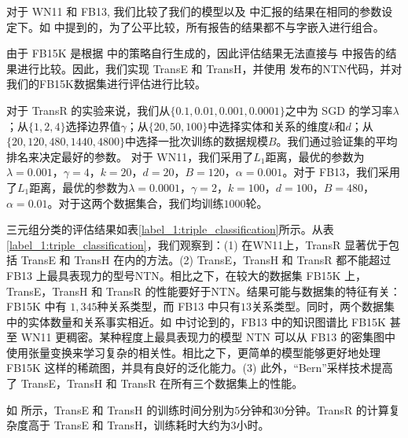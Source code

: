     对于 WN11 和 FB13, 我们比较了我们的模型以及  中汇报的结果在相同的参数设定下。如  中提到的，为了公平比较，所有报告的结果都不与字嵌入进行组合。

    由于 FB15K 是根据  中的策略自行生成的，因此评估结果无法直接与  中报告的结果进行比较。因此，我们实现 TransE 和 TransH，并使用  发布的NTN代码，并对我们的FB15K数据集进行评估进行比较。

    对于 TransR 的实验来说，我们从$\{0.1, 0.01, 0.001, 0.0001\}$之中为 SGD 的学习率$\lambda$；从$\{1, 2, 4\}$选择边界值$\gamma$；从$\{20,50,100\}$中选择实体和关系的维度$k$和$d$；从$\{20, 120, 480, 1440, 4800\}$中选择一批次训练的数据规模$B$。我们通过验证集的平均排名来决定最好的参数。
    对于 WN11，我们采用了$L_1$距离，最优的参数为$\lambda = 0.001$，$\gamma= 4$，$k = 20$，$d = 20$，$B = 120$，$\alpha=0.001$。对于 FB13，我们采用了$L_1$距离，最优的参数为$\lambda = 0.0001$，$\gamma = 2$，$k = 100$，$d = 100$，$B = 480$，$\alpha=0.01$。对于这两个数据集合，我们均训练$1000$轮。

    三元组分类的评估结果如表\ref{label_1:triple_classification}所示。从表\ref{label_1:triple_classification}，我们观察到：(1) 在WN11上，TransR 显著优于包括 TransE 和 TransH 在内的方法。(2) TransE，TransH 和 TransR 都不能超过 FB13 上最具表现力的型号NTN。相比之下，在较大的数据集 FB15K 上，TransE，TransH 和 TransR 的性能要好于NTN。结果可能与数据集的特征有关：FB15K 中有 $1,345$种关系类型，而 FB13 中只有$13$关系类型。同时，两个数据集中的实体数量和关系事实相近。如  中讨论到的，FB13 中的知识图谱比 FB15K 甚至 WN11 更稠密。某种程度上最具表现力的模型 NTN 可以从 FB13 的密集图中使用张量变换来学习复杂的相关性。相比之下，更简单的模型能够更好地处理 FB15K 这样的稀疏图，并具有良好的泛化能力。(3) 此外，``Bern''采样技术提高了 TransE，TransH 和 TransR 在所有三个数据集上的性能。

    如  所示，TransE 和 TransH 的训练时间分别为$5$分钟和$30$分钟。TransR 的计算复杂度高于 TransE 和 TransH，训练耗时大约为$3$小时。

